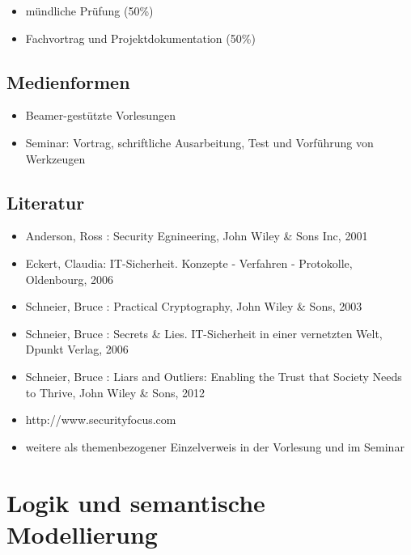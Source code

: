 \begin{itemize}
\tightlist
\item
  mündliche Prüfung (50\%)
\item
  Fachvortrag und Projektdokumentation (50\%)
\end{itemize}

\section*{Medienformen\label{/mi-2017/modulbeschreibungen-master/MA_WTW_Modul_IT-Sicherheit}}\label{medienformenpathlabelmi-2017modulbeschreibungen-mastermaux5fwtwux5fmodulux5fit-sicherheit}

\begin{itemize}
\tightlist
\item
  Beamer-gestützte Vorlesungen
\item
  Seminar: Vortrag, schriftliche Ausarbeitung, Test und Vorführung von
  Werkzeugen
\end{itemize}

\section*{Literatur\label{/mi-2017/modulbeschreibungen-master/MA_WTW_Modul_IT-Sicherheit}}\label{literaturpathlabelmi-2017modulbeschreibungen-mastermaux5fwtwux5fmodulux5fit-sicherheit}

\begin{itemize}
\tightlist
\item
  Anderson, Ross : Security Egnineering, John Wiley \& Sons Inc, 2001
\item
  Eckert, Claudia: IT-Sicherheit. Konzepte - Verfahren - Protokolle,
  Oldenbourg, 2006
\item
  Schneier, Bruce : Practical Cryptography, John Wiley \& Sons, 2003
\item
  Schneier, Bruce : Secrets \& Lies. IT-Sicherheit in einer vernetzten
  Welt, Dpunkt Verlag, 2006
\item
  Schneier, Bruce : Liars and Outliers: Enabling the Trust that Society
  Needs to Thrive, John Wiley \& Sons, 2012
\item
  http://www.securityfocus.com
\item
  weitere als themenbezogener Einzelverweis in der Vorlesung und im
  Seminar
\end{itemize}

\chapter{Logik und semantische
Modellierung\label{/mi-2017/modulbeschreibungen-master/MA_WTW_Modul_Logik-und-semantische-Modellierung}}\label{logik-und-semantische-modellierungpathlabelmi-2017modulbeschreibungen-mastermaux5fwtwux5fmodulux5flogik-und-semantische-modellierung}

